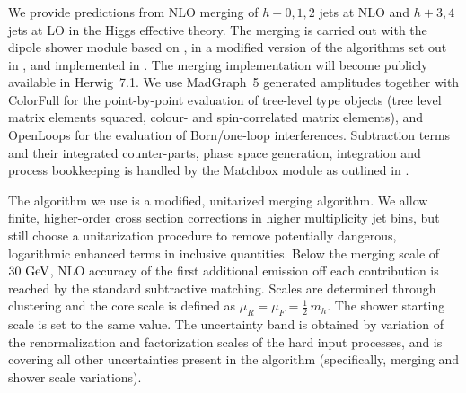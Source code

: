 \subsubsection{\Herwig}
\label{sec:hjetscomp:tools:mc:herwig}

We provide predictions from NLO merging of $h+0,1,2$ jets at NLO and $h+3,4$
jets at LO in the Higgs effective theory. The merging is carried out with the
\Herwig \ \cite{Bellm:2015jjp} dipole shower module based on
\cite{Platzer:2009jq,Platzer:2011bc}, in a modified version of the algorithms
set out in \cite{Platzer:2012bs,Lonnblad:2012ix}, and implemented in
\cite{Bellm:thesis,Bellm:2016xxx}. The merging implementation will become
publicly available in \textsf{Herwig~7.1}. We use \textsf{MadGraph~5}
\cite{Alwall:2011uj} generated amplitudes together with \textsf{ColorFull}
\cite{Sjodahl:2014opa} for the point-by-point evaluation of tree-level type
objects (tree level matrix elements squared, colour- and spin-correlated
matrix elements), and \textsf{OpenLoops} \cite{Cascioli:2011va} for the
evaluation of Born/one-loop interferences.  Subtraction terms and their
integrated counter-parts, phase space generation, integration and process
bookkeeping is handled by the \textsf{Matchbox} module as outlined in
\cite{Bellm:2015jjp}.

The algorithm we use is a modified, unitarized merging algorithm. We allow
finite, higher-order cross section corrections in higher multiplicity jet
bins, but still choose a unitarization procedure to remove potentially
dangerous, logarithmic enhanced terms in inclusive quantities. Below the
merging scale of $30\ {\rm GeV}$, NLO accuracy of the first additional
emission off each contribution is reached by the standard subtractive
matching. Scales are determined through clustering and the core scale 
is defined as $\mu_R=\mu_F=\tfrac{1}{2}\,m_h$. The shower starting scale 
is set to the same value. The uncertainty band is obtained by variation of 
the renormalization and factorization scales of the hard input processes, 
and is covering all other uncertainties present in the algorithm 
(specifically, merging and shower scale variations).
